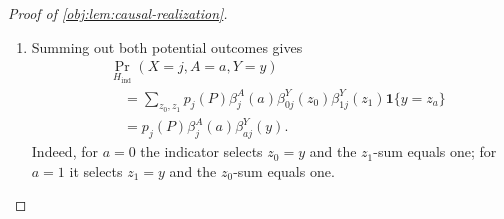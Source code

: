 \begin{proof}[Proof of \cref{obj:lem:causal-realization}]
\begin{enumerate}
Define the treatment and potential-outcome Bernoulli masses by
\[
\beta^A_j(a)=
\begin{cases}
1-e_j(P),&a=0,\\
e_j(P),&a=1,
\end{cases}
\qquad
\beta^Y_{aj}(z)=
\begin{cases}
1-\mu_{aj}(P),&z=0,\\
\mu_{aj}(P),&z=1.
\end{cases}
\]
These definitions apply to every cell and arm, including those with
zero mass. By \cref{obj:synth_7}, they are nonnegative and satisfy
\[
\sum_a\beta^A_j(a)=1,\qquad
\sum_z\beta^Y_{aj}(z)=1.
\]
For a binary pair \((z_0,z_1)\), write
\[
z_a=
\begin{cases}
z_0,&a=0,\\
z_1,&a=1.
\end{cases}
\]
Construct \(H_{\mathrm{ind}}\) through its atom masses:
\[
\Pr_{H_{\mathrm{ind}}}
 (X=j,A=a,Y=y,Y_0=z_0,Y_1=z_1)
=
p_j(P)\beta^A_j(a)
\beta^Y_{0j}(z_0)\beta^Y_{1j}(z_1)
\mathbf1\{y=z_a\}.
\]
Every entry is nonnegative. Summing the factual-outcome indicator
first and then the remaining binary coordinates yields
\[
\begin{aligned}
&\sum_{j=1}^{d}\sum_{a,y,z_0,z_1}
\Pr_{H_{\mathrm{ind}}}
 (X=j,A=a,Y=y,Y_0=z_0,Y_1=z_1)\\
&\quad=
\sum_{j=1}^{d}p_j(P)
 \left(\sum_a\beta^A_j(a)\right)
 \left(\sum_{z_0}\beta^Y_{0j}(z_0)\right)
 \left(\sum_{z_1}\beta^Y_{1j}(z_1)\right)
=1.
\end{aligned}
\]
Hence the displayed table defines a probability law; normalization
preserves its atom masses.

\item
Summing out both potential outcomes gives
\[
\begin{aligned}
&\Pr_{H_{\mathrm{ind}}}(X=j,A=a,Y=y)\\
&\quad=
\sum_{z_0,z_1}
p_j(P)\beta^A_j(a)
\beta^Y_{0j}(z_0)\beta^Y_{1j}(z_1)
\mathbf1\{y=z_a\}\\
&\quad=p_j(P)\beta^A_j(a)\beta^Y_{aj}(y).
\end{aligned}
\]
Indeed, for \(a=0\) the indicator selects \(z_0=y\) and the
\(z_1\)-sum equals one; for \(a=1\) it selects \(z_1=y\) and the
\(z_0\)-sum equals one.


\end{enumerate}
\end{proof}
